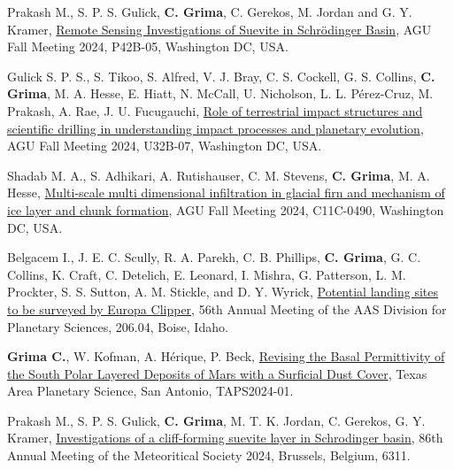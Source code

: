 \begin{etaremune}
\item
    Prakash M., S. P. S. Gulick, \textbf{C. Grima}, C. Gerekos, M. Jordan and G. Y. Kramer, \href{https://agu.confex.com/agu/agu24/meetingapp.cgi/Paper/1611066}{Remote Sensing Investigations of Suevite in Schrödinger Basin}, AGU Fall Meeting 2024, P42B-05, Washington DC, USA.
    
\item
    Gulick S. P. S., S. Tikoo, S. Alfred, V. J. Bray, C. S. Cockell, G. S. Collins, \textbf{C. Grima}, M. A. Hesse, E. Hiatt, N. McCall, U. Nicholson, L. L. Pérez-Cruz, M. Prakash, A. Rae, J. U. Fucugauchi, \href{https://agu.confex.com/agu/agu24/meetingapp.cgi/Paper/1707094}{Role of terrestrial impact structures and scientific drilling in understanding impact processes and planetary evolution}, AGU Fall Meeting 2024, U32B-07, Washington DC, USA.

\item
    Shadab M. A., S. Adhikari, A. Rutishauser, C. M. Stevens, \textbf{C. Grima}, M. A. Hesse, \href{https://agu.confex.com/agu/agu24/meetingapp.cgi/Paper/1526301}{Multi-scale multi dimensional infiltration in glacial firn and mechanism of ice layer and chunk formation}, AGU Fall Meeting 2024, C11C-0490, Washington DC, USA.

\item
    Belgacem I., J. E. C. Scully, R. A. Parekh, C. B. Phillips, \textbf{C. Grima}, G. C. Collins, K. Craft, C. Detelich, E. Leonard, I. Mishra, G. Patterson, L. M. Prockter, S. S. Sutton, A. M. Stickle, and D. Y. Wyrick,   \href{https://submissions.mirasmart.com/DPS56/Itinerary/PresentationDetail.aspx?evdid=59}{Potential landing sites to be surveyed by Europa Clipper}, 56th Annual Meeting of the AAS Division for Planetary Sciences, 206.04, Boise, Idaho.

\item
   \textbf{Grima C.}, W. Kofman, A. Hérique, P. Beck, \href{https://drive.google.com/file/d/17kSupFJCrgi3--fEiE2FkWA5e0QUbko7/view}{Revising the Basal Permittivity of the South Polar Layered Deposits of Mars with a Surficial Dust Cover}, Texas Area Planetary Science, San Antonio, TAPS2024-01.

\item
    Prakash M., S. P. S. Gulick, \textbf{C. Grima}, M. T. K. Jordan, C. Gerekos, G. Y. Kramer, \href{https://www.hou.usra.edu/meetings/metsoc2024/pdf/6311.pdf}{Investigations of a cliff-forming suevite layer in Schrodinger basin}, 86th Annual Meeting of the Meteoritical Society 2024, Brussels, Belgium, 6311.


\end{etaremune}
